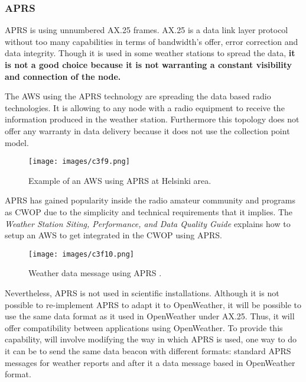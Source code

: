 {\subsubsection{APRS}

\gls{APRS} is using unnumbered \gls{AX.25} frames\cite{AX25}. \gls{AX.25} is a data link layer protocol without  too many capabilities in terms of bandwidth's offer, error correction and data integrity. Though it is used in some weather stations to spread the data, \textbf{it is not a good choice because it is not warranting a constant visibility and connection of the node.} 

The \gls{AWS} using the APRS technology are spreading the data based radio technologies. It is allowing to any node with a radio equipment to receive the information produced in the weather station. Furthermore this topology does not offer any warranty in data delivery because it does not use the collection point model.

\begin{figure}[H]
\centerline{\texttt{[image: images/c3f9.png]}}
\caption{Example of an \protect \gls{AWS} using APRS at Helsinki area\protect \footnotemark.}
\end{figure}


\gls{APRS} has gained popularity inside the radio amateur community and programs as \gls{CWOP} due to the simplicity and technical requirements that it implies. The \emph{Weather Station Siting, Performance, and Data Quality Guide}\cite{CWOPGUIDE} explains how to setup an \gls{AWS} to get integrated in the \gls{CWOP} using \gls{APRS}.

\begin{figure}[H]
\centerline{\texttt{[image: images/c3f10.png]}}
\caption{Weather data message using \protect \gls{APRS} \protect \cite{APRS}.}
\end{figure}

Nevertheless, \gls{APRS} is not used in scientific installations. Although it is not possible to re-implement \gls{APRS} to adapt it to OpenWeather, it will be possible to use the same data format as it used in OpenWeather under \gls{AX.25}. Thus, it will offer compatibility between applications using OpenWeather. To provide this capability, will involve modifying the way in which \gls{APRS} is used, one way to do it can be to send the same data beacon with different formats: standard \gls{APRS} messages for weather reports and after it a data message based in OpenWeather format.

}
